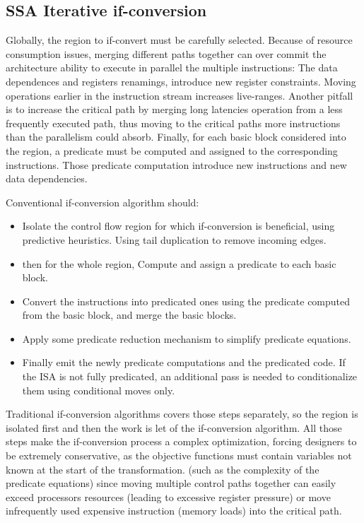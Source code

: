 \subsection{SSA Iterative if-conversion}


Globally, the region to if-convert must be carefully selected. Because of resource consumption issues, merging different paths together can over commit the architecture ability to execute in parallel the multiple instructions: The data dependences and registers renamings, introduce new register constraints. Moving operations earlier in the instruction stream increases live-ranges. 
Another pitfall is to increase the critical path by merging long latencies operation from a less frequently executed path, thus moving to the critical paths more instructions than the parallelism could absorb.
Finally, for each basic block considered into the region, a predicate must be computed and assigned to the corresponding instructions. Those predicate computation introduce new instructions and new data dependencies.

Conventional if-conversion algorithm should:

\begin{itemize}
\item Isolate the control flow region for which if-conversion is beneficial, using predictive heuristics. Using tail duplication to remove incoming edges. 
\item then for the whole region, Compute and assign a predicate to each basic block.
\item Convert the instructions into predicated ones using the predicate computed from the basic block, and merge the basic blocks.
\item Apply some predicate reduction mechanism to simplify predicate equations.
\item Finally emit the newly predicate computations and the predicated code. If the ISA is not fully predicated, an additional pass is needed to conditionalize them using conditional moves only.
\end{itemize}

Traditional if-conversion algorithms \cite{Schlansker-predicated} covers those steps separately, so the region is isolated first and then the work is let of the if-conversion algorithm. All those steps make the if-conversion process a complex optimization, forcing designers to be extremely conservative, as the objective functions must contain variables not known at the start of the transformation. (such as the complexity of the predicate equations) since moving multiple control paths together can easily exceed processors resources (leading to excessive register pressure) or move infrequently used expensive instruction (memory loads) into the critical path. 

